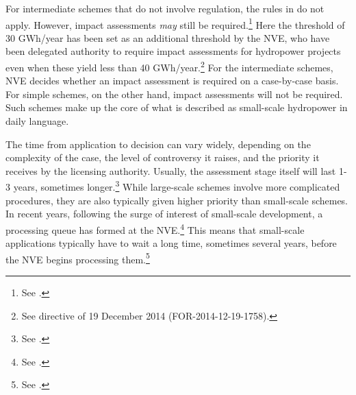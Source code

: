 For intermediate schemes that do not involve regulation, the rules in \cite{wra17} do not apply. However, impact assessments {\it may} still be required.\footnote{See \cite[20]{stokker10}.} Here the threshold of 30 GWh/year has been set as an additional threshold by the NVE, who have been delegated authority to require impact assessments for hydropower projects even when these yield less than 40 GWh/year.\footnote{See directive of 19 December 2014 (FOR-2014-12-19-1758).} For the intermediate schemes, NVE decides whether an impact assessment is required on a case-by-case basis. For simple schemes, on the other hand, impact assessments will not be required. Such schemes make up the core of what is described as small-scale hydropower in daily language.

The time from application to decision can vary widely, depending on the complexity of the case, the level of controversy it raises, and the priority it receives by the licensing authority. Usually, the assessment stage itself will last 1-3 years, sometimes longer.\footnote{See \cite[84-85]{nou129}.} While large-scale schemes involve more complicated procedures, they are also typically given higher priority than small-scale schemes. In recent years, following the surge of interest of small-scale development, a processing queue has formed at the NVE.\footnote{See \cite[84]{nou129}.} This means that small-scale applications typically have to wait a long time, sometimes several years, before the NVE begins processing them.\footnote{See \cite[84]{nou129}.}


